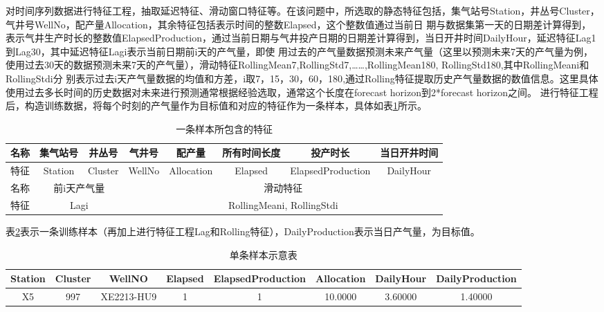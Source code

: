 对时间序列数据进行特征工程，抽取延迟特征、滑动窗口特征等。在该问题中，所选取的静态特征包括，集气站号Station，井丛号Cluster，气井号WellNo，配产量Allocation，其余特征包括表示时间的整数Elapsed，这个整数值通过当前日
期与数据集第一天的日期差计算得到，表示气井生产时长的整数值ElapsedProduction，通过当前日期与气井投产日期的日期差计算得到，当日开井时间DailyHour，延迟特征Lag1到Lag30，其中延迟特征Lagi表示当前日期前i天的产气量，即使
用过去的产气量数据预测未来产气量（这里以预测未来7天的产气量为例，使用过去30天的数据预测未来7天的产气量），滑动特征RollingMean7,RollingStd7,……,RollingMean180, RollingStd180,其中RollingMeani和RollingStdi分
别表示过去i天产气量数据的均值和方差，i取{7，15，30，60，180},通过Rolling特征提取历史产气量数据的数值信息。这里具体使用过去多长时间的历史数据对未来进行预测通常根据经验选取，通常这个长度在forecast horizon到2*forecast horizon之间。
进行特征工程后，构造训练数据，将每个时刻的产气量作为目标值和对应的特征作为一条样本，具体如表\ref{tab:asamplefeature}所示。
\begin{table}[H]
    \renewcommand{\arraystretch}{1.5}
    \centering
    \caption{一条样本所包含的特征}
    \label{tab:asamplefeature}
    \begin{tabular}{|c|c|c|c|c|c|c|c|}
        \hline
        名称 & 集气站号 & 井丛号 & 气井号 & 配产量 & 所有时间长度 & 投产时长 & 当日开井时间 \\
        \hline
        特征 & Station & Cluster & WellNo & Allocation & Elapsed & ElapsedProduction & DailyHour\\
        \hline
        名称 & \multicolumn{2}{c|}{前i天产气量} & \multicolumn{5}{c|}{滑动特征}     \\
        \hline
        特征 & \multicolumn{2}{c|}{Lag{i}} & \multicolumn{5}{c|}{RollingMean{i}, RollingStd{i}}\\
        \hline
    \end{tabular}
\end{table}
表\ref{tab:singlesamp}表示一条训练样本（再加上进行特征工程Lag和Rolling特征），DailyProduction表示当日产气量，为目标值。
\begin{table}[H]
    \renewcommand{\arraystretch}{1.5}
    \centering
    \caption{单条样本示意表}
    \label{tab:singlesamp}
    \begin{tabular}{|c|c|c|c|c|c|c|c|}
        \hline
        Station & Cluster & WellNO & Elapsed & ElapsedProduction &Allocation & DailyHour & DailyProduction \\
        \hline
        X5 & 997 & XE2213-HU9 & 1 & 1& 10.0000 & 3.60000 & 1.40000 \\
        \hline
    \end{tabular}
\end{table}
